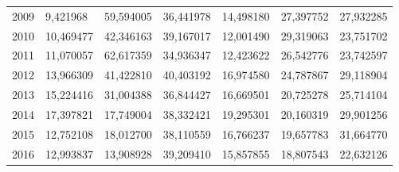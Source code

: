 \begin{table}
\begin{tabular}{p{1cm}p{2cm}p{2cm}p{2cm}p{2cm}p{2cm}p{2cm}}
 2009 &                                 9,421968 &       59,594005 &                                   36,441978 &                               14,498180 &                    27,397752 & 27,932285 \\
 2010 &                                10,469477 &       42,346163 &                                   39,167017 &                               12,001490 &                    29,319063 & 23,751702 \\
 2011 &                                11,070057 &       62,617359 &                                   34,936347 &                               12,423622 &                    26,542776 & 23,742597 \\
 2012 &                                13,966309 &       41,422810 &                                   40,403192 &                               16,974580 &                    24,787867 & 29,118904 \\
 2013 &                                15,224416 &       31,004388 &                                   36,844427 &                               16,669501 &                    20,725278 & 25,714104 \\
 2014 &                                17,397821 &       17,749004 &                                   38,332421 &                               19,295301 &                    20,160319 & 29,901256 \\
 2015 &                                12,752108 &       18,012700 &                                   38,110559 &                               16,766237 &                    19,657783 & 31,664770 \\
 2016 &                                12,993837 &       13,908928 &                                   39,209410 &                               15,857855 &                    18,807543 & 22,632126 \\
\bottomrule
\end{tabular}
\end{table}
